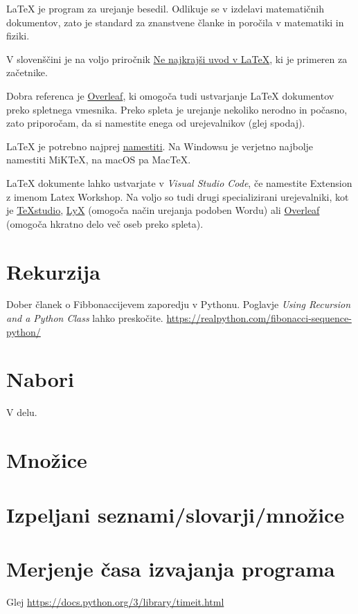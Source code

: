 \documentclass[
]{report}
\begin{document}
LaTeX je program za urejanje besedil. Odlikuje se v izdelavi matematičnih dokumentov, zato je standard za znanstvene članke in poročila v matematiki in fiziki.

V slovenščini je na voljo priročnik \href{https://users.fmf.uni-lj.si/plestenjak/Vaje/LaTeX/lshort.pdf}{Ne najkrajši uvod v LaTeX}, ki je primeren za začetnike.

Dobra referenca je \href{https://www.overleaf.com/learn}{Overleaf}, ki omogoča tudi ustvarjanje LaTeX dokumentov preko spletnega vmesnika. Preko spleta je urejanje nekoliko nerodno in počasno, zato priporočam, da si namestite enega od urejevalnikov (glej spodaj).

LaTeX je potrebno najprej \href{https://www.latex-project.org/get/}{namestiti}. Na Windowsu je verjetno najbolje namestiti MiKTeX, na macOS pa MacTeX.

LaTeX dokumente lahko ustvarjate v \emph{Visual Studio Code}, če namestite Extension z imenom Latex Workshop. Na voljo so tudi drugi specializirani urejevalniki, kot je \href{https://www.texstudio.org}{TeXstudio}, \href{https://www.lyx.org}{LyX} (omogoča način urejanja podoben Wordu) ali \href{https://www.overleaf.com}{Overleaf} (omogoča hkratno delo več oseb preko spleta).

\hypertarget{rekurzija}{%
\section{Rekurzija}\label{rekurzija}}

Dober članek o Fibbonaccijevem zaporedju v Pythonu. Poglavje \emph{Using Recursion and a Python Class} lahko preskočite.
\url{https://realpython.com/fibonacci-sequence-python/}

\hypertarget{nabori-1}{%
\section{Nabori}\label{nabori-1}}

V delu.

\hypertarget{mnoux17eice-1}{%
\section{Množice}\label{mnoux17eice-1}}

\hypertarget{izpeljani-seznamislovarjimnoux17eice}{%
\section{Izpeljani seznami/slovarji/množice}\label{izpeljani-seznamislovarjimnoux17eice}}

\hypertarget{merjenje-ux10dasa-izvajanja-programa}{%
\section{Merjenje časa izvajanja programa}\label{merjenje-ux10dasa-izvajanja-programa}}

Glej \url{https://docs.python.org/3/library/timeit.html}
\end{document}
